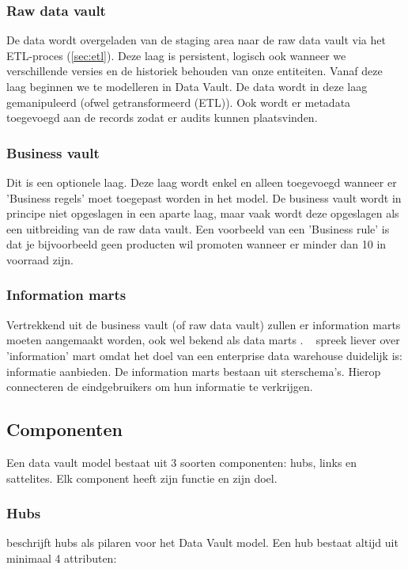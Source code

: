 \subsubsection{Raw data vault}
De data wordt overgeladen van de staging area naar de raw data vault via het ETL-proces (\ref{sec:etl}). Deze laag is persistent, logisch ook wanneer we verschillende versies en de historiek behouden van onze entiteiten. Vanaf deze laag beginnen we te modelleren in Data Vault. De data wordt in deze laag gemanipuleerd (ofwel getransformeerd (ETL)). Ook wordt er metadata toegevoegd aan de records zodat er audits kunnen plaatsvinden. 

\subsubsection{Business vault}
Dit is een optionele laag. Deze laag wordt enkel en alleen toegevoegd wanneer er 'Business regels' moet toegepast worden in het model. De business vault wordt in principe niet opgeslagen in een aparte laag, maar vaak wordt deze opgeslagen als een uitbreiding van de raw data vault. Een voorbeeld van een 'Business rule' is dat je bijvoorbeeld geen producten wil promoten wanneer er minder dan 10 in voorraad zijn.

\subsubsection{Information marts}
Vertrekkend uit de business vault (of raw data vault) zullen er information marts moeten aangemaakt worden, ook wel bekend als data marts . ~\textcite{Linstedt2016} spreek liever over 'information' mart omdat het doel van een enterprise data warehouse duidelijk is: informatie aanbieden. 
De information marts bestaan uit sterschema's. Hierop connecteren de eindgebruikers om hun informatie te verkrijgen. 

\subsection{Componenten}
Een data vault model bestaat uit 3 soorten componenten: hubs, links en sattelites. Elk component heeft zijn functie en zijn doel.

\subsubsection{Hubs}
\textcite{Linstedt2016} beschrijft hubs als pilaren voor het Data Vault model. Een hub bestaat altijd uit minimaal 4 attributen:

